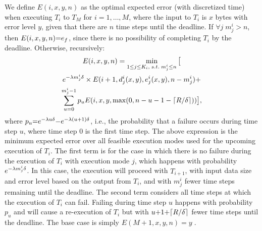 We define $E(i, x, y, n)$ as the optimal expected error (with discretized time)
when executing $T_{i}$ to
$T_{M}$ for $i{=}1,\ldots,M$, where the input to $T_{i}$ is $x$ bytes
with error level $y$, given that there are $n$ time steps until the
deadline.  If $\forall j\; m_j^i{>}n$, then $E(i, x, y, n){=}e_{f}$, since
there is no possibility of completing $T_{i}$ by the deadline.
Otherwise, recursively:
\begin{multline}
\label{eq:dp1}
E(i, x, y, n) = 
    \min_{1\leq j \leq K_i,\; s.t.\; m_j^i \leq n} \big[\\
e^{-\lambda m_{j}^i \delta} \times E(i+1, d_j^i(x,y), e_j^i(x,y), n - m_j^i) + \\
	\sum_{u=0}^{m_j^i - 1} p_u E(i, x, y, \max(0, n - u - 1 - \lceil R/\delta \rceil)) \big],
\end{multline}
\noindent
where $p_u{=}e^{-\lambda u \delta}{-}e^{-\lambda (u+1) \delta}$, i.e., the probability that a failure
occurs during time step $u$, where time step 0 is the first time step. 
The above expression is the minimum expected error over all feasible execution modes used for the upcoming execution of $T_{i}$.  The first term 
is for the case in which there is no failure during the execution of $T_{i}$ with execution mode $j$, which happens with probability
$e^{-\lambda m_{j}^i \delta}$. In this case, the execution will proceed with
$T_{i+1}$, with input data size and error level based on the
output from $T_{i}$, and with 
$m_j^i$ fewer time steps remaining until the deadline. The second term considers all time steps at which the
execution of $T_{i}$ can fail. Failing during time step $u$ happens with
probability $p_u$ and will cause a re-execution of $T_i$ but with
$u{+}1{+}\lceil R/\delta \rceil$ fewer
time steps until the deadline.  The base case is
simply $E(M+1, x, y, n) = y\;$.


